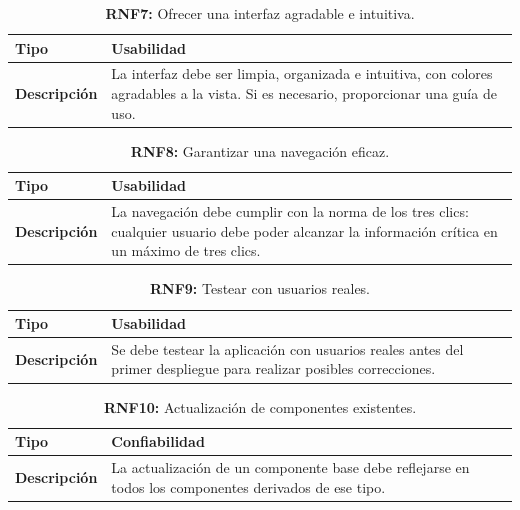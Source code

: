 \documentclass[a4paper, 12pt]{article}
\begin{document}
\begin{table}[H]
\captionsetup{list=no}%
\captionsetup{justification=raggedright,singlelinecheck=false}
\captionsetup{labelformat=empty}
\caption{\textbf{RNF7:} Ofrecer una interfaz agradable e intuitiva. }
\label{tab:RNF7}
    \begin{tabular}{|m{5cm}|m{10cm}|}
	    \hline
	    \textbf{Tipo} & Usabilidad \\ 
	    \hline
	    \textbf{Descripción} & La interfaz debe ser limpia, organizada e intuitiva, con colores agradables a la vista. Si es necesario, proporcionar una guía de uso. \\ 
	    \hline
    \end{tabular}
\end{table}

\begin{table}[H]
\captionsetup{list=no}%
\captionsetup{justification=raggedright,singlelinecheck=false}
\captionsetup{labelformat=empty}
\caption{\textbf{RNF8:} Garantizar una navegación eficaz.}
\label{tab:RNF8}
    \begin{tabular}{|m{5cm}|m{10cm}|}
	    \hline
	    \textbf{Tipo} & Usabilidad \\ 
	    \hline
	    \textbf{Descripción} & La navegación debe cumplir con la norma de los tres clics: cualquier usuario debe poder alcanzar la información crítica en un  máximo de tres clics. \\ 
	    \hline
    \end{tabular}
\end{table}

\begin{table}[H]
\captionsetup{list=no}%
\captionsetup{justification=raggedright,singlelinecheck=false}
\captionsetup{labelformat=empty}
\caption{\textbf{RNF9:} Testear con usuarios reales.}
\label{tab:RNF9}
    \begin{tabular}{|m{5cm}|m{10cm}|}
	    \hline
	    \textbf{Tipo} & Usabilidad \\ 
	    \hline
	    \textbf{Descripción} & Se debe testear la aplicación con usuarios reales antes del primer despliegue para realizar posibles correcciones. \\ 
	    \hline
    \end{tabular}
\end{table}

\begin{table}[H]
\captionsetup{list=no}%
\captionsetup{justification=raggedright,singlelinecheck=false}
\captionsetup{labelformat=empty}
\caption{\textbf{RNF10:} Actualización de componentes existentes.}
\label{tab:RNF10}
    \begin{tabular}{|m{5cm}|m{10cm}|}
	    \hline
	    \textbf{Tipo} & Confiabilidad \\ 
	    \hline
	    \textbf{Descripción} & La actualización de un componente base debe reflejarse en todos los componentes derivados de ese tipo. \\ 
	    \hline
    \end{tabular}
\end{table}
\end{document}
